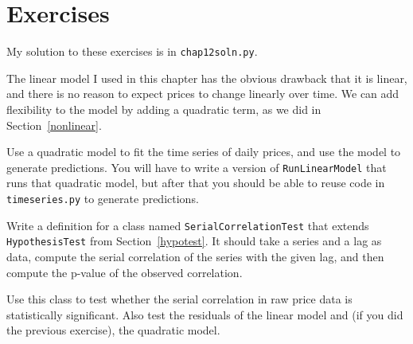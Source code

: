 \documentclass[12pt]{book}
\begin{document}
\section{Exercises}

My solution to these exercises is in \verb"chap12soln.py".

\begin{exercise}
The linear model I used in this chapter has the obvious drawback
that it is linear, and there is no reason to expect prices to
change linearly over time.
We can add flexibility to the model by adding a quadratic term,
as we did in Section~\ref{nonlinear}.  

Use a quadratic model to fit the time series of daily prices,
and use the model to generate predictions.  You will have to
write a version of {\tt RunLinearModel} that runs that quadratic
model, but after that you should be able to reuse code in
{\tt timeseries.py} to generate predictions.

\end{exercise}

\begin{exercise}
Write a definition for a class named {\tt SerialCorrelationTest}
that extends {\tt HypothesisTest} from Section~\ref{hypotest}.
It should take a series and a lag as data, compute the serial
correlation of the series with the given lag, and then compute
the p-value of the observed correlation.

Use this class to test whether the serial correlation in raw
price data is statistically significant.  Also test the residuals
of the linear model and (if you did the previous exercise),
the quadratic model.
   

\end{exercise}
\end{document}
